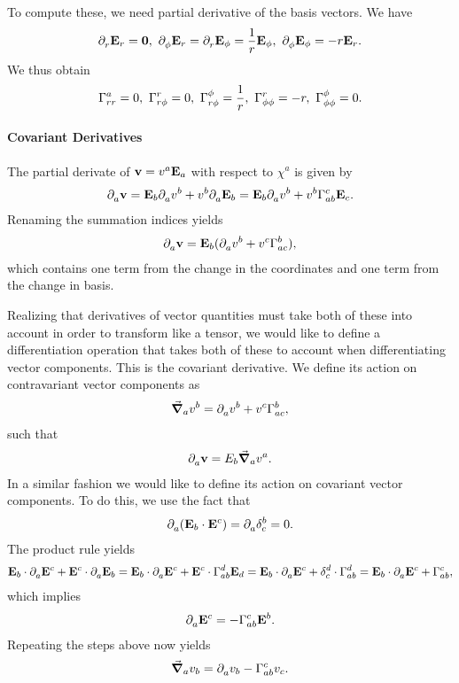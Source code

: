 To compute these, we need partial derivative of the basis vectors. We have
\begin{align*}
	\partial^{}_{r}{\vb{E}_{r}} = \vb{0},\ \partial^{}_{\phi}{\vb{E}_{r}} = \partial^{}_{r}{\vb{E}_{\phi}} = \frac{1}{r}\vb{E}_{\phi},\ \partial^{}_{\phi}{\vb{E}_{\phi}} = -r\vb{E}_{r}.
\end{align*}
We thus obtain
\begin{align*}
	\chris{a}{r}{r} = 0,\ \chris{r}{r}{\phi} = 0,\ \chris{\phi}{r}{\phi} = \frac{1}{r},\ \chris{r}{\phi}{\phi} = -r,\ \chris{\phi}{\phi}{\phi} = 0.
\end{align*}

\paragraph{Covariant Derivatives}
The partial derivate of $\vb{v} = v^{a}\vb{E}_{a}$ with respect to $\chi^{a}$ is given by
\begin{align*}
	\del{}{a}{\vb{v}} = \tb{b}\del{}{a}{v^{b}} + v^{b}\del{}{a}{\tb{b}} = \tb{b}\del{}{a}{v^{b}} + v^{b}\chris{c}{a}{b}\tb{c}.
\end{align*}
Renaming the summation indices yields
\begin{align*}
	\del{}{a}{\vb{v}} = \tb{b}(\del{}{a}{v^{b}} + v^{c}\chris{b}{a}{c}),
\end{align*}
which contains one term from the change in the coordinates and one term from the change in basis.

Realizing that derivatives of vector quantities must take both of these into account in order to transform like a tensor, we would like to define a differentiation operation that takes both of these to account when differentiating vector components. This is the covariant derivative. We define its action on contravariant vector components as
\begin{align*}
	\dcov{a}{v^{b}} = \del{}{a}{v^{b}} + v^{c}\chris{b}{a}{c},
\end{align*}
such that
\begin{align*}
	\partial^{}_{a}{\vb{v}} = E_{b}\grad_{a}{v^{a}}.
\end{align*}
In a similar fashion we would like to define its action on covariant vector components. To do this, we use the fact that
\begin{align*}
	\del{}{a}{(\tb{b}\cdot\db{c})} = \del{}{a}{\kdelta{b}{c}} = 0.
\end{align*}
The product rule yields
\begin{align*}
	\tb{b}\cdot\del{}{a}{\db{c}} + \db{c}\cdot\del{}{a}{\tb{b}} = \tb{b}\cdot\del{}{a}{\db{c}} + \db{c}\cdot\chris{d}{a}{b}\tb{d} = \tb{b}\cdot\del{}{a}{\db{c}} + \kdelta{d}{c}\cdot\chris{d}{a}{b} = \tb{b}\cdot\del{}{a}{\db{c}} + \chris{c}{a}{b},
\end{align*}
which implies
\begin{align*}
	\del{}{a}{\db{c}} = -\chris{c}{a}{b}\db{b}.
\end{align*}
Repeating the steps above now yields
\begin{align*}
	\dcov{a}{v_{b}} = \del{}{a}{v_{b}} - \chris{c}{a}{b}v_{c}.
\end{align*}

